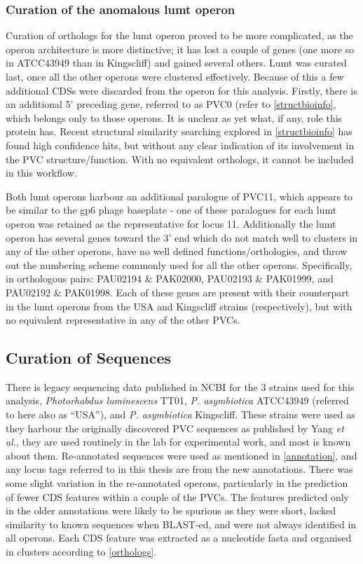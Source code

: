 \subsubsection{Curation of the anomalous lumt operon}\label{anomalouslumt}
Curation of orthologs for the lumt operon proved to be more complicated, as the operon architecture is more distinctive; it has lost a couple of genes (one more so in ATCC43949 than in Kingscliff) and gained several others. Lumt was curated last, once all the other operons were clustered effectively. Because of this a few additional CDSs were discarded from the operon for this analysis. Firstly, there is an additional 5' preceding gene, referred to as PVC0 (refer to \vref{structbioinfo}, which belongs only to those operons. It is unclear as yet what, if any, role this protein has. Recent structural similarity searching explored in \vref{structbioinfo} has found high confidence hits, but without any clear indication of its involvement in the PVC structure/function. With no equivalent orthologs, it cannot be included in this workflow.

Both lumt operons harbour an additional paralogue of PVC11, which appears to be similar to the gp6 phage baseplate - one of these paralogues for each lumt operon was retained as the representative for locus 11. Additionally the lumt operon has several genes toward the 3' end which do not match well to clusters in any of the other operons, have no well defined functions/orthologies, and throw out the numbering scheme commonly used for all the other operons. Specifically, in orthologous pairs: PAU02194 \& PAK02000, PAU02193 \& PAK01999, and PAU02192 \& PAK01998. Each of these genes are present with their counterpart in the lumt operons from the USA and Kingscliff strains (respectively), but with no equivalent representative in any of the other PVCs.


\subsection{Curation of Sequences}
	There is legacy sequencing data published in NCBI for the 3 strains used for this analysis, \emph{Photorhabdus luminescens} TT01, \emph{P. asymbiotica} ATCC43949 (referred to here also as ``USA''), and \emph{P. asymbiotica} Kingscliff. These strains were used as they harbour the originally discovered PVC sequences as published by Yang \emph{et al.}\citep{Yang2006}, they are used routinely in the lab for experimental work, and most is known about them. Re-annotated sequences were used as mentioned in \vref{annotation}, and any locus tags referred to in this thesis are from the new annotations. There was some slight variation in the re-annotated operons, particularly in the prediction of fewer CDS features within a couple of the PVCs. The features predicted only in the older annotations were likely to be spurious as they were short, lacked similarity to known sequences when BLAST-ed, and were not always identified in all operons. Each CDS feature was extracted as a nucleotide fasta and organised in clusters according to \vref{orthologs}. 
	
